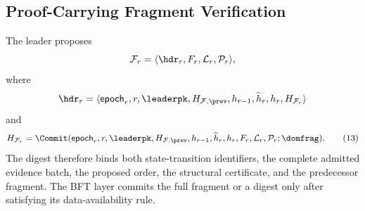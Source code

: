 \subsection{Proof-Carrying Fragment Verification}
\label{sec:proof-carrying-verification}

The leader proposes
\[
 \mathcal F_r=\langle\hdr_r,F_r,\mathcal L_r,\mathcal P_r\rangle,
\]
where
\[
 \hdr_r=\langle\mathsf{epoch}_r,r,\leaderpk,H_{\mathcal F,\prev},
 h_{r-1},\widehat h_r,h_r,H_{\mathcal F_r}\rangle
\]
and
\[
 H_{\mathcal F_r}=\Commit(\mathsf{epoch}_r,r,\leaderpk,
 H_{\mathcal F,\prev},h_{r-1},\widehat h_r,h_r,
 F_r,\mathcal L_r,\mathcal P_r;\domfrag).
 \tag{13}\label{eq:fragment}
\]
The digest therefore binds both state-transition identifiers, the complete
admitted evidence batch, the proposed order, the structural certificate, and
the predecessor fragment.  The BFT layer commits the full fragment or a
digest only after satisfying its data-availability rule.

